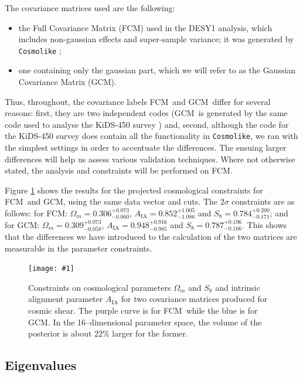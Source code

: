 \documentclass[twocolumn]{\docclass}
\newcommand{\sfig}[2]{
	\texttt{[image: \#1]}
}
\newcommand{\Sfig}[2]{
	\begin{figure}[thbp]
		\sfig{../figures/#1.pdf}{\columnwidth}
		\caption{{\small #2}}
		\label{fig:#1}
	\end{figure}
}
\newcommand{\rf}[1]{Figure \ref{fig:#1}}
\newcommand\full{FCM}
\newcommand\gaussian{GCM}
\newcommand\scott[1]{{\bf [Scott: #1]}}
\begin{document}
	
	The covariance matrices used are the following: %
	\begin{itemize}
		\item the Full Covariance Matrix (\full) used in the DESY1 analysis, which includes non-gaussian effects and super-sample variance; it was generated by {\tt Cosmolike} \citep{Krause:2016jvl};
		\item one containing only the gaussian part, which we will refer to as the Gaussian Covariance Matrix (\gaussian). %
	\end{itemize}
	Thus, throughout, the covariance labels \full\ and \gaussian\ differ for several reasons: first, they are two independent codes (\gaussian\ is generated by the same code used to analyse the KiDS-450 survey \citep{Kohlinger:2017sxk})
	and, second, although the code for the KiDS-450 survey does contain all the functionality in {\tt Cosmolike}, we ran with the simplest settings in order to accentuate the differences. The ensuing larger differences will help us assess various validation techniques. Where not otherwise stated, the analysis and constraints will be performed on \full.
	
	\rf{Y1-constraints_wmS8A} shows the results for the projected cosmological constraints for \full\ and \gaussian, using the same data vector and cuts. The $2\sigma$ constraints are as follows: for \full: $\Omega_m= 0.306^{+ 0.073}_{- 0.060}$, $A_{\mathrm{IA}} = 0.852^{+ 1.005}_{- 1.086}$ and $S_8 = 0.784^{+ 0.200}_{- 0.171}$; and for \gaussian: $\Omega_m = 0.309^{+ 0.073}_{- 0.058}$, 	$A_{\mathrm{IA}} = 0.948^{+ 0.916}_{- 0.985}$ and $S_8 = 0.787^{+ 0.196}_{- 0.166}$. This shows that the differences we have introduced to the calculation of the two matrices are measurable in the parameter constraints.
	
	\Sfig{Y1-constraints_wmS8A}{Constraints on cosmological parameters $\Omega_m$ and $S_8$ and intrinsic alignment parameter $A_{\mathrm{IA}}$ for two covariance matrices produced for cosmic shear. The purple curve is for \full\ while the blue is for \gaussian. In the 16--dimensional parameter space, the volume of the posterior is about $22\%$ larger for the former.}
	
	\subsection{Eigenvalues}
	\label{subsec:eigenvalues}
	
\end{document}
